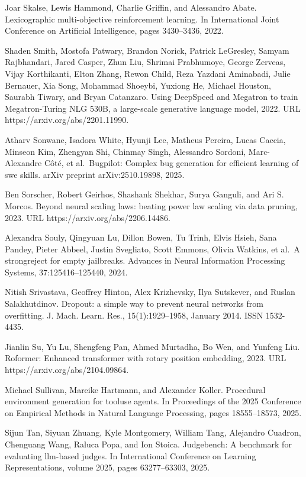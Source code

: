 Joar Skalse, Lewis Hammond, Charlie Griffin, and Alessandro Abate.
Lexicographic multi-objective reinforcement learning. In International
Joint Conference on Artificial Intelligence, pages 3430--3436, 2022.

Shaden Smith, Mostofa Patwary, Brandon Norick, Patrick LeGresley, Samyam
Rajbhandari, Jared Casper, Zhun Liu, Shrimai Prabhumoye, George Zerveas,
Vijay Korthikanti, Elton Zhang, Rewon Child, Reza Yazdani Aminabadi,
Julie Bernauer, Xia Song, Mohammad Shoeybi, Yuxiong He, Michael Houston,
Saurabh Tiwary, and Bryan Catanzaro. Using DeepSpeed and Megatron to
train Megatron-Turing NLG 530B, a large-scale generative language model,
2022. URL https://arxiv.org/abs/2201.11990.

Atharv Sonwane, Isadora White, Hyunji Lee, Matheus Pereira, Lucas
Caccia, Minseon Kim, Zhengyan Shi, Chinmay Singh, Alessandro Sordoni,
Marc-Alexandre Côté, et al.~Bugpilot: Complex bug generation for
efficient learning of swe skills. arXiv preprint arXiv:2510.19898, 2025.

Ben Sorscher, Robert Geirhos, Shashank Shekhar, Surya Ganguli, and Ari
S. Morcos. Beyond neural scaling laws: beating power law scaling via
data pruning, 2023. URL https://arxiv.org/abs/2206.14486.

Alexandra Souly, Qingyuan Lu, Dillon Bowen, Tu Trinh, Elvis Hsieh, Sana
Pandey, Pieter Abbeel, Justin Svegliato, Scott Emmons, Olivia Watkins,
et al.~A strongreject for empty jailbreaks. Advances in Neural
Information Processing Systems, 37:125416--125440, 2024.

Nitish Srivastava, Geoffrey Hinton, Alex Krizhevsky, Ilya Sutskever, and
Ruslan Salakhutdinov. Dropout: a simple way to prevent neural networks
from overfitting. J. Mach. Learn. Res., 15(1):1929--1958, January 2014.
ISSN 1532-4435.

Jianlin Su, Yu Lu, Shengfeng Pan, Ahmed Murtadha, Bo Wen, and Yunfeng
Liu. Roformer: Enhanced transformer with rotary position embedding,
2023. URL https://arxiv.org/abs/2104.09864.

Michael Sullivan, Mareike Hartmann, and Alexander Koller. Procedural
environment generation for tooluse agents. In Proceedings of the 2025
Conference on Empirical Methods in Natural Language Processing, pages
18555--18573, 2025.

Sijun Tan, Siyuan Zhuang, Kyle Montgomery, William Tang, Alejandro
Cuadron, Chenguang Wang, Raluca Popa, and Ion Stoica. Judgebench: A
benchmark for evaluating llm-based judges. In International Conference
on Learning Representations, volume 2025, pages 63277--63303, 2025.

